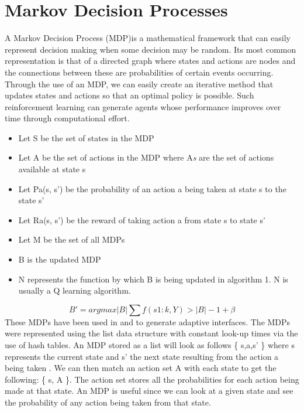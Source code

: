 \documentclass[11pt, conference, compsoc]{IEEEtran}
\begin{document}
\section{      Markov Decision Processes}
A Markov Decision Process (MDP)\cite{sutton1998introduction}is a mathematical framework that can easily represent decision making when some decision may be random. Its most common representation is that of a directed graph where states and actions are nodes and the connections between these are probabilities of certain events occurring. Through the use of an MDP, we can easily create an iterative method that updates states and actions so that an optimal policy is possible. Such reinforcement learning can generate agents whose performance improves over time through computational effort.\cite{white1991survey}
\vspace{2.0 mm}

\begin{itemize}
	\item Let S be the set of states in the MDP
	\item Let A be the set of actions in the MDP where A\textit{s} are the set of actions available at state s
	\item Let Pa(s, s') be the probability of an action a being taken at state s to the state s'
	\item Let Ra(s, s') be the reward of taking action a from state s to state s'
	\item Let M be the set of all MDPs
	\item B is the updated MDP
	\item N represents the function by which B is being updated in algorithm 1. N is usually a Q learning algorithm.
	
\end{itemize}
	\begin{equation}
	B' =  argmax{|B| \sum f(s1:k, Y) > |B| - 1 + \beta}
	\end{equation}
These MDPs have been used in \cite{ramamoorthy2013latent} and \cite{rosman2014user} to generate adaptive interfaces. The MDPs were represented using the list data structure with constant look-up times via the use of hash tables. An MDP stored as a list will look as follows \{ s,a,s' \}
where s represents the current state and s' the next state resulting from the action a being taken \cite{andrade2005challenge}. We can then match an action set A with each state to get the following:
\{ s, A \}. The action set stores all the probabilities for each action being made at that state. An MDP is useful since we can look at a given state and see the probability of any action being taken from that state.
\end{document}
